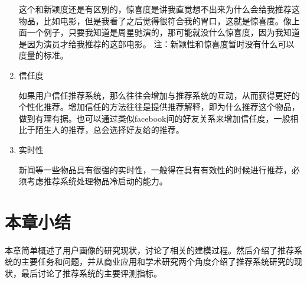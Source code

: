 \begin{enumerate}[(1)]
			这个和新颖度还是有区别的，惊喜度是讲我直觉想不出来为什么会给我推荐这物品，比如电影，但是我看了之后觉得很符合我的胃口，这就是惊喜度。像上面一个例子，只要我知道是周星驰演的，那可能就没什么惊喜度，因为我知道是因为演员才给我推荐的这部电影。 注：新颖性和惊喜度暂时没有什么可以度量的标准。
			\item 信任度

			如果用户信任推荐系统，那么往往会增加与推荐系统的互动，从而获得更好的个性化推荐。增加信任的方法往往是提供推荐解释，即为什么推荐这个物品，做到有理有据。也可以通过类似facebook间的好友关系来增加信任度，一般相比于陌生人的推荐，总会选择好友给的推荐。
			\item 实时性

			新闻等一些物品具有很强的实时性，一般得在具有有效性的时候进行推荐，必须考虑推荐系统处理物品冷启动的能力。
			\end{enumerate}

	\section{本章小结}
	本章简单概述了用户画像的研究现状，讨论了相关的建模过程。然后介绍了推荐系统的主要任务和问题，并从商业应用和学术研究两个角度介绍了推荐系统研究的现状，最后讨论了推荐系统的主要评测指标。